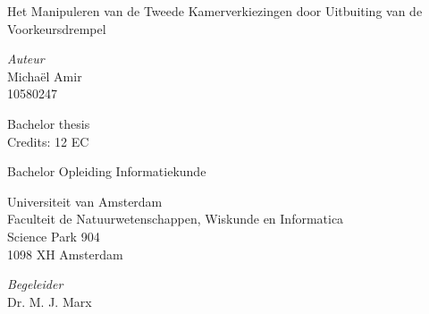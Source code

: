 

\begin{center}

\vspace{2.5cm}

\begin{Huge}
Het Manipuleren van de Tweede Kamerverkiezingen door Uitbuiting van de Voorkeursdrempel
\end{Huge}

\vspace{1.5cm}

\emph{Auteur}\\
Micha\"{e}l Amir\\
10580247

\vspace{1.5cm}

Bachelor thesis\\
Credits: 12 EC

\vspace{0.5cm}

Bachelor Opleiding Informatiekunde

\vspace{0.25cm}

Universiteit van Amsterdam\\
Faculteit de Natuurwetenschappen, Wiskunde en Informatica\\
Science Park 904\\
1098 XH Amsterdam

\vspace{4cm}

\emph{Begeleider}\\
Dr. M. J. Marx


\end{center}
